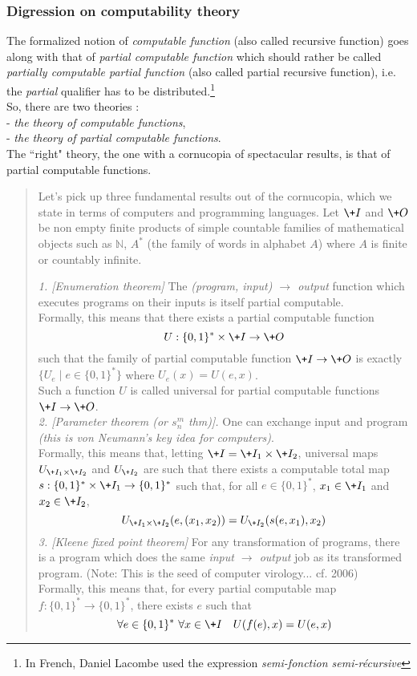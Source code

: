 \subsubsection{Digression on computability theory}
\label{sss:partial}
The formalized notion of {\em computable function}
(also called recursive function)
goes along with that of {\em partial computable function}
which should rather be called
{\em partially computable partial function}
(also called partial recursive function),
i.e. the {\em partial} qualifier has to be
distributed.\footnote{In French, Daniel Lacombe used the
expression {\em semi-fonction semi-r\'ecursive}}
\\
So, there are two theories :
\\\indent- {\em the theory of  computable functions},
\\\indent- {\em the theory of partial computable functions}.
\\
The ``right" theory, the one with a cornucopia of spectacular
results, is that of partial computable functions.
{\small\begin{quote}
Let's pick up three fundamental results out of the cornucopia,
which we state in terms of computers and programming languages.
Let $\+I$ and $\+O$ be non empty finite products of
simple countable families of mathematical objects such as
${\mathbb N}$, $A^*$ (the family of words in alphabet $A$)
where $A$ is finite or countably infinite.
\begin{theorem}\label{thm:3thms}
{\em 1. [Enumeration theorem]}
The {\em(program, input) $\to$ output} function
which executes programs on their inputs
is itself partial computable.
\\
Formally, this means that there exists a partial computable
function
$$
U: {\{0,1\}^*}\times\+I \to \+O
$$
such that the family of partial computable function
$\+I \to \+O$ is exactly
$\{U_e \mid e\in {\{0,1\}^*}\}$ where $U_e(x)=U(e,x)$.
\\
Such a function $U$ is called universal for partial
computable functions $\+I \to \+O$.
\medskip\\
{\em 2. [Parameter theorem (or $s^m_n$ thm)].}
One can exchange input and program
{\em(this is von Neumann's key idea for computers)}.
\\
Formally, this means that, letting $\+I=\+I_1\times \+I_2$,
universal maps $U_{\+I_1\times \+I_2}$ and $U_{\+I_2}$
are such that there exists a computable total map
$s: {\{0,1\}^*}\times \+I_1 \to {\{0,1\}^*}$
such that, for all $e\in {\{0,1\}^*}$,
$x_1\in \+I_1$ and $x_2\in \+I_2$,
$$
U_{\+I_1\times \+I_2}(e,(x_1,x_2)) = U_{\+I_2}(s(e,x_1),x_2)
$$
{\em 3. [Kleene fixed point theorem]}
For any transformation of programs, there is a program
which does the same {\em input $\to$ output} job
as its transformed program.
(Note: This is the seed of computer virology...
cf. \cite{BKM06} 2006)
\\
Formally, this means that, for every partial computable map
$f: {\{0,1\}^*}\to {\{0,1\}^*}$, there exists $e$ such that
$$
\forall e\in {\{0,1\}^*}\ \forall x\in\+I\ \ \
U(f(e),x)=U(e,x)
$$
\end{theorem}
\end{quote}}
